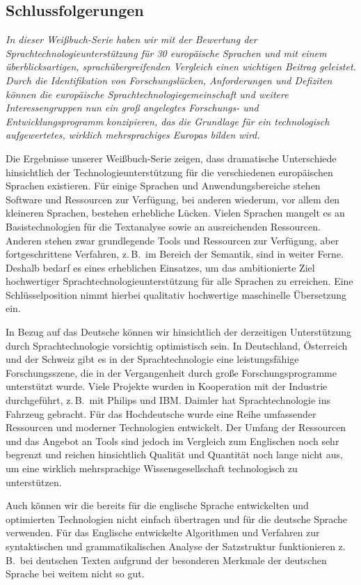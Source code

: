 \begin{multicols}{2}
\subsection{Schlussfolgerungen}

\emph{In dieser Weißbuch-Serie haben wir mit der Bewertung der Sprachtechnologieunterstützung für 30 europäische Sprachen und mit einem überblicksartigen, sprachübergreifenden Vergleich einen wichtigen Beitrag geleistet. Durch die Identifikation von Forschungslücken, Anforderungen und Defiziten können die europäische Sprachtechnologiegemeinschaft und weitere Interessengruppen nun ein groß angelegtes Forschungs- und Entwicklungsprogramm konzipieren, das die Grundlage für ein technologisch aufgewertetes, wirklich mehrsprachiges Europas bilden wird.}

Die Ergebnisse unserer Weißbuch-Serie zeigen, dass dramatische Unterschiede hinsichtlich der Technologieunterstützung für die verschiedenen europäischen Sprachen existieren. Für einige Sprachen und Anwendungsbereiche stehen Software und Ressourcen zur Verfügung, bei anderen wiederum, vor allem den kleineren Sprachen, bestehen erhebliche Lücken. Vielen Sprachen mangelt es an Basistechnologien für die Textanalyse sowie an ausreichenden Ressourcen. Anderen stehen zwar grundlegende Tools und Ressourcen zur Verfügung, aber fortgeschrittene Verfahren, z.\,B.~im Bereich der Semantik, sind in weiter Ferne. 
Deshalb bedarf es eines erheblichen Einsatzes, um das ambitionierte Ziel hochwertiger Sprachtechnologieunterstützung für alle Sprachen zu erreichen. Eine Schlüsselposition nimmt hierbei qualitativ hochwertige maschinelle Übersetzung ein.

In Bezug auf das Deutsche können wir hinsichtlich der derzeitigen Unterstützung durch Sprachtechnologie vorsichtig optimistisch sein. In Deutschland, Österreich und der Schweiz gibt es 
in der Sprachtechnologie eine leistungsfähige Forschungsszene, die in der Vergangenheit durch große Forschungsprogramme unterstützt wurde. 
Viele Projekte wurden in Kooperation mit der Industrie durchgeführt, z.\,B.~mit Philips und IBM. Daimler hat Sprachtechnologie ins Fahrzeug gebracht.
Für das Hochdeutsche wurde eine Reihe umfassender Ressourcen und moderner Technologien entwickelt. Der Umfang der Ressourcen und das Angebot an Tools sind jedoch im Vergleich zum Englischen noch sehr begrenzt und reichen hinsichtlich Qualität und Quantität noch lange nicht aus, um eine wirklich mehrsprachige Wissensgesellschaft technologisch zu unterstützen.

Auch können wir die bereits für die englische Sprache entwickelten und optimierten Technologien nicht einfach übertragen und für die deutsche Sprache verwenden. Für das Englische entwickelte Algorithmen und Verfahren zur syntaktischen und grammatikalischen Analyse der Satzstruktur funktionieren z.\,B.~bei deutschen Texten aufgrund der besonderen Merkmale der deutschen Sprache bei weitem nicht so gut.


\end{multicols}
